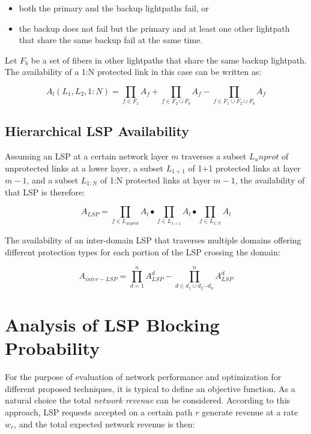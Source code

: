 \begin{itemize}
\item both the primary and the backup lightpaths fail, or
\item the backup does not fail but the primary and at least one other lightpath that share the same backup fail at the same time. 
\end{itemize}

Let $F_{b}$ be a set of fibers in other lightpaths that share the same backup lightpath. The availability of a 1:N protected link in this case can be written as:

\begin{equation}
A_{l}(L_{1},L_{2},1:N)=\prod_{f\in F_{1}}A_{f}+\prod_{f\in F_{2}\cup F_{b}}A_{f}-\prod_{f\in F_{1}\cup F_{2}\cup F_{b}}A_{f}
\label{eqn:1For1Availability}
\end{equation}



\subsection{Hierarchical LSP Availability}
Assuming an LSP at a certain network layer $m$ traverses a subset
$L_{u}nprot$ of unprotected links at a lower layer, a subset $L_{1+1}$
of 1+1 protected links at layer $m-1$, and a subset $L_{1:N}$ of
1:N protected links at layer $m-1$, the availability of that LSP
is therefore:

\begin{equation}
A_{LSP}=\prod_{f\in L_{unprot}}A_{l}\bullet\prod_{f\in L_{1+1}}A_{l}\bullet\prod_{f\in L_{1:N}}A_{l}
\label{eqn:LspAvailability}
\end{equation}


The availability of an inter-domain LSP that traverses multiple domains
offering different protection types for each portion of the LSP crossing
the domain:

\begin{equation}
A_{inter-LSP}=\prod_{d=1}^{n}A_{LSP}^{d}-\prod_{d\in d_{1}\cup d_{2}\cdots d_{n}}^{n}A_{LSP}^{d}
\label{eqn:InterLspAvailability}
\end{equation}

\section{Analysis of LSP Blocking Probability}
For the purpose of evaluation of network performance and optimization for different proposed techniques, it is typical to define an objective function. As a natural choice the total \emph{network revenue} can be considered. According to this approach, LSP requests accepted on a certain path $r$ generate revenue at a rate $w_r$, and the total expected network revenue is then:

